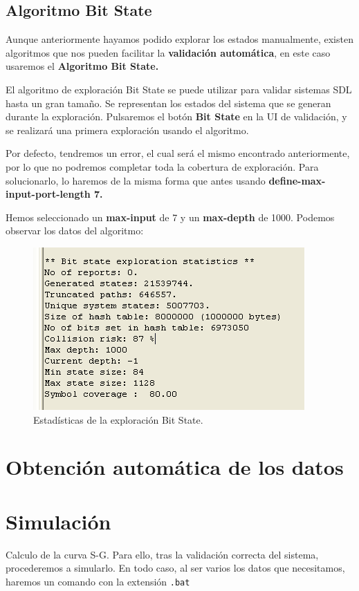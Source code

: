 \documentclass{article}
\begin{document}
\subsection{Algoritmo Bit State}

Aunque anteriormente hayamos podido explorar los estados manualmente, existen algoritmos que nos pueden facilitar la \textbf{validación automática}, en este caso usaremos el \textbf{Algoritmo Bit State.}

El algoritmo de exploración Bit State se puede utilizar para validar sistemas SDL hasta un gran tamaño. Se representan los estados del sistema que se generan durante la exploración. Pulsaremos el botón \textbf{Bit State} en la UI de validación, y se realizará una primera exploración usando el algoritmo.

\quad 

Por defecto, tendremos un error, el cual será el mismo encontrado anteriormente, por lo que no podremos completar toda la cobertura de exploración. Para solucionarlo, lo haremos de la misma forma que antes usando \textbf{define-max-input-port-length 7.}

Hemos seleccionado un \textbf{max-input} de 7 y un \textbf{max-depth} de 1000. Podemos observar los datos del algoritmo:
 
\begin{figure}[h]
    \centering
    \includegraphics[width=0.65\linewidth]{src/bit state.png}
    \caption{\label{fig:bitstate} Estadísticas de la exploración Bit State.}
\end{figure}


\section{Obtención automática de los datos}



\section{Simulación}

Calculo de la curva S-G. Para ello, tras la validación correcta del sistema, procederemos a simularlo. En todo caso, al ser varios los datos que necesitamos, haremos un comando con la extensión \verb|.bat|
\end{document}
